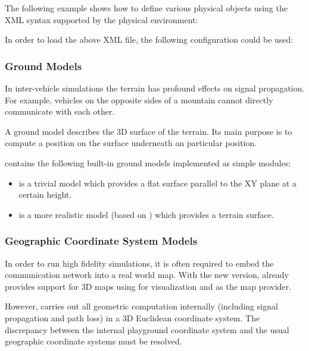 The following example shows how to define various physical objects using the XML syntax supported by the physical environment:


In order to load the above XML file, the following configuration could be used:


\subsubsection*{Ground Models}
In inter-vehicle simulations the terrain has profound effects on signal propagation. For example, vehicles on the opposite sides of a mountain cannot directly communicate with each other.

A ground model describes the 3D surface of the terrain. Its main purpose is to compute a position on the surface underneath an particular position.

\inet contains the following built-in ground models implemented as \omnet simple modules:

\begin{itemize}
        \item {} is a trivial model which provides a flat surface parallel to the XY plane at a certain height.
        \item {} is a more realistic model (based on ) which provides a terrain surface.
\end{itemize}

\subsubsection*{Geographic Coordinate System Models}
In order to run high fidelity simulations, it is often required to embed the communication network into a real world map. With the new  version, \inet already provides support for 3D maps using  for visualization and  as the map provider.

However, \inet carries out all geometric computation internally (including signal propagation and path loss) in a 3D Euclidean coordinate system. The discrepancy between the internal playground coordinate system and the usual geographic coordinate systems must be resolved.

